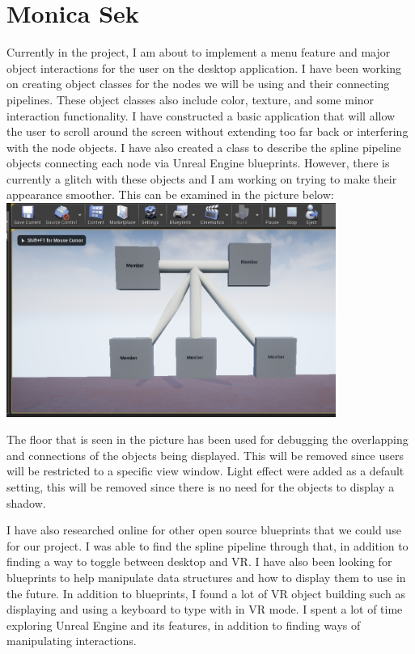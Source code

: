 \documentclass[onecolumn, draftclsnofoot, 10pt, compsoc]{IEEEtran}
\begin{document}
\section{Monica Sek}
\begin{singlespace}
Currently in the project, I am about to implement a menu feature and major object interactions for the user on the desktop application. I have been working on creating object classes for the nodes we will be using and their connecting pipelines. These object classes also include color, texture, and some minor interaction functionality. I have constructed a basic application that will allow the user to scroll around the screen without extending too far back or interfering with the node objects. I have also created a class to describe the spline pipeline objects connecting each node via Unreal Engine blueprints. However, there is currently a glitch with these objects and I am working on trying to make their appearance smoother. This can be examined in the picture below:\\
\newline
\includegraphics[height=7cm]{tree}
\newline

The floor that is seen in the picture has been used for debugging the overlapping and connections of the objects being displayed. This will be removed since users will be restricted to a specific view window. Light effect were added as a default setting, this will be removed since there is no need for the objects to display a shadow. 

I have also researched online for other open source blueprints that we could use for our project. I was able to find the spline pipeline through that, in addition to finding a way to toggle between desktop and VR. I have also been looking for blueprints to help manipulate data structures and how to display them to use in the future. In addition to blueprints, I found a lot of VR object building such as displaying and using a keyboard to type with in VR mode. I spent a lot of time exploring Unreal Engine and its features, in addition to finding ways of manipulating interactions. 


\end{singlespace}
\end{document}
